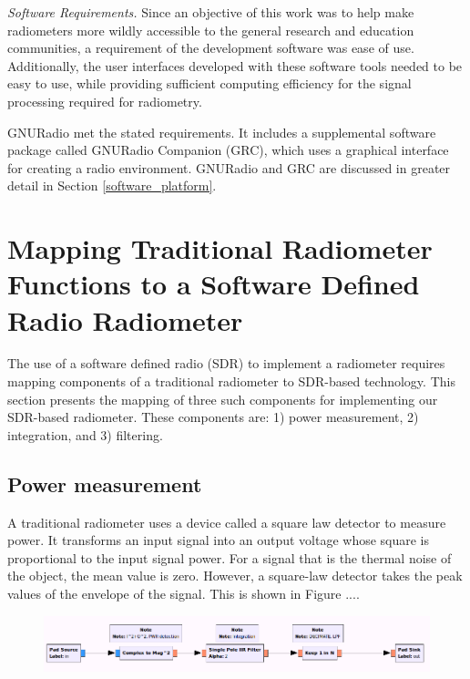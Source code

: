 \emph{Software Requirements.}  Since an objective of this work was to help make radiometers more wildly accessible to the general research and education communities, a requirement of the development software was ease of use.  Additionally, the user interfaces developed with these software tools needed to be easy to use, while providing sufficient computing efficiency for the signal processing required for radiometry.

GNURadio met the stated requirements.  It includes a supplemental software package called GNURadio Companion (GRC), which uses a graphical interface for creating a radio environment.  GNURadio and GRC are discussed in greater detail in Section \ref{software_platform}.


\section{Mapping Traditional Radiometer Functions to a Software Defined Radio Radiometer}

The use of a software defined radio (SDR) to implement a radiometer requires mapping components of a traditional radiometer to SDR-based technology.  This section presents the mapping of three such components for implementing our SDR-based radiometer.  These components are:  1) power measurement, 2) integration, and 3) filtering.

\subsection{Power measurement}

A traditional radiometer uses a device called a square law detector to measure power.  It transforms an input signal into an output voltage whose square is proportional to the input signal power.  For a signal that is the thermal noise of the object, the mean value is zero.  However, a square-law detector takes the peak values of the envelope of the signal.  This is shown in Figure ....


{\begin{figure}[h!tb] 
\centering
\includegraphics[width=17cm]{Images/TPR_grc.png}
\label{square_block}
\end{figure}
}

